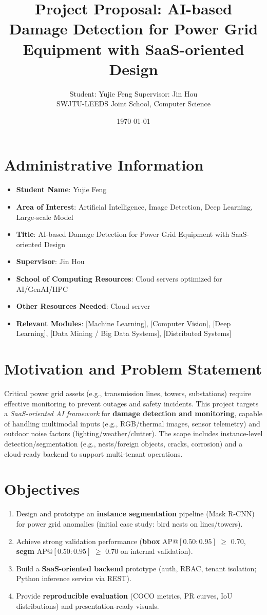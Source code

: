 \documentclass[11pt,a4paper]{article}
\title{Project Proposal: AI-based Damage Detection for Power Grid Equipment with SaaS-oriented Design}
\author{Student: Yujie Feng \quad Supervisor: Jin Hou\\
SWJTU-LEEDS Joint School, Computer Science}
\date{\today}
\begin{document}
\maketitle
\onehalfspacing

\section*{Administrative Information}
\begin{itemize}[leftmargin=*]
  \item \textbf{Student Name}: Yujie Feng
  \item \textbf{Area of Interest}: Artificial Intelligence, Image Detection, Deep Learning, Large-scale Model
  \item \textbf{Title}: AI-based Damage Detection for Power Grid Equipment with SaaS-oriented Design
  \item \textbf{Supervisor}: Jin Hou
  \item \textbf{School of Computing Resources}: Cloud servers optimized for AI/GenAI/HPC
  \item \textbf{Other Resources Needed}: Cloud server
  \item \textbf{Relevant Modules}: [Machine Learning], [Computer Vision], [Deep Learning], [Data Mining / Big Data Systems], [Distributed Systems] %
\end{itemize}

\section{Motivation and Problem Statement}
Critical power grid assets (e.g., transmission lines, towers, substations) require effective monitoring to prevent outages and safety incidents. This project targets a \emph{SaaS-oriented AI framework} for \textbf{damage detection and monitoring}, capable of handling multimodal inputs (e.g., RGB/thermal images, sensor telemetry) and outdoor noise factors (lighting/weather/clutter). The scope includes instance-level detection/segmentation (e.g., nests/foreign objects, cracks, corrosion) and a cloud-ready backend to support multi-tenant operations.

\section{Objectives}
\begin{enumerate}[leftmargin=*]
  \item Design and prototype an \textbf{instance segmentation} pipeline (Mask R-CNN) for power grid anomalies (initial case study: bird nests on lines/towers).
  \item Achieve strong validation performance (\textbf{bbox} AP@\([0.50:0.95]\) $\ge$ 0.70, \textbf{segm} AP@\([0.50:0.95]\) $\ge$ 0.70 on internal validation).
  \item Build a \textbf{SaaS-oriented backend} prototype (auth, RBAC, tenant isolation; Python inference service via REST).
  \item Provide \textbf{reproducible evaluation} (COCO metrics, PR curves, IoU distributions) and presentation-ready visuals.
\end{enumerate}
\end{document}
